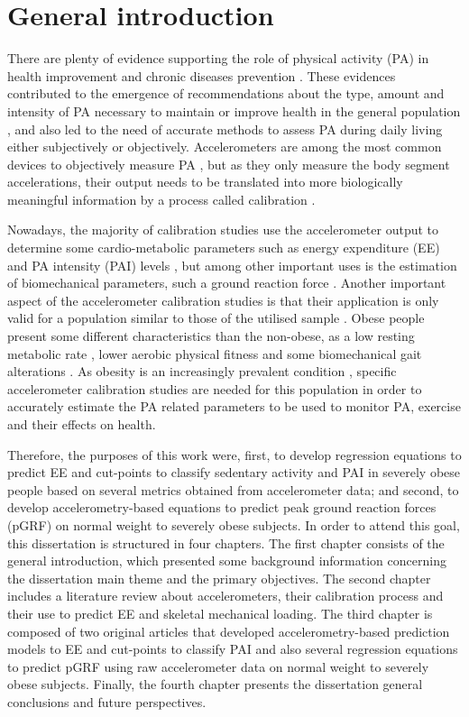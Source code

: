 \documentclass[12pt]{article}
\begin{document}
\section*{General introduction}

There are plenty of evidence supporting the role of physical activity (PA) in health improvement and chronic diseases prevention . These evidences contributed to the emergence of recommendations about the type, amount and intensity of PA necessary to maintain  or improve health in the general population , and also led to the need of accurate methods to assess PA during daily living  either subjectively or objectively. Accelerometers are among the most common devices to objectively measure PA , but as they only measure the body segment accelerations, their output needs to be translated into more biologically meaningful information by a process called calibration .
 
Nowadays, the majority of calibration studies use the accelerometer output to determine some cardio-metabolic parameters such as energy expenditure (EE) and PA intensity (PAI) levels , but among other important uses is the estimation of biomechanical parameters, such a ground reaction force . Another important aspect of the accelerometer calibration studies is that their application is only valid for a population similar to those of the utilised sample . Obese people present some different characteristics than the non-obese, as a low resting metabolic rate , lower aerobic physical fitness  and some biomechanical gait alterations . As obesity is an increasingly prevalent condition , specific accelerometer calibration studies are needed for this population in order to accurately estimate the PA related parameters to be used to monitor PA, exercise and their effects on health.

Therefore, the purposes of this work were, first, to develop regression equations to predict EE and cut-points to classify sedentary activity and PAI in severely obese people based on several metrics obtained from accelerometer data; and second, to develop accelerometry-based equations to predict peak ground reaction forces (pGRF) on normal weight to severely obese subjects. In order to attend this goal, this dissertation is structured in four chapters. The first chapter consists of the general introduction, which presented some background information concerning the dissertation main theme and the primary objectives. The second chapter includes a literature review about accelerometers, their calibration process and their use to predict EE and skeletal mechanical loading. The third chapter is composed of two original articles that developed accelerometry-based prediction models to EE and cut-points to classify PAI and also several regression equations to predict pGRF using raw accelerometer data on normal weight to severely obese subjects. Finally, the fourth chapter presents the dissertation general conclusions and future perspectives.
\end{document}
